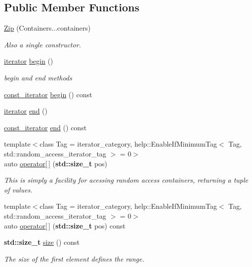 \subsection*{Public Member Functions}
\begin{DoxyCompactItemize}
\item 
\hyperlink{classit_1_1Zip_a21617f423c19eaefd796225605f7f4c3}{Zip} (Containers...\+containers)
\begin{DoxyCompactList}\small\item\em Also a single constructor. \end{DoxyCompactList}\item 
\hyperlink{classit_1_1Zip_a6f4a405b96cce4346e1a34522031366a}{iterator} \hyperlink{classit_1_1Zip_af2e6f1d41c32c94a8b790a4870bd9340}{begin} ()
\begin{DoxyCompactList}\small\item\em begin and end methods \end{DoxyCompactList}\item 
\hyperlink{classit_1_1Zip_ac9c7dacbb33c23f586cb8886fdd58275}{const\+\_\+iterator} \hyperlink{classit_1_1Zip_a1867c9ddfe0d78c7d6d826d6938ca7eb}{begin} () const 
\item 
\hyperlink{classit_1_1Zip_a6f4a405b96cce4346e1a34522031366a}{iterator} \hyperlink{classit_1_1Zip_aa9d9cb83973543f951a798e1052cc84a}{end} ()
\item 
\hyperlink{classit_1_1Zip_ac9c7dacbb33c23f586cb8886fdd58275}{const\+\_\+iterator} \hyperlink{classit_1_1Zip_aec064915b95a39b28b8eee0933c0ce5c}{end} () const 
\item 
{\footnotesize template$<$class Tag  = iterator\+\_\+category, help\+::\+Enable\+If\+Minimum\+Tag$<$ Tag, std\+::random\+\_\+access\+\_\+iterator\+\_\+tag $>$  = 0$>$ }\\auto \hyperlink{classit_1_1Zip_a48f42897ce4f6651f0eb093b80409bde}{operator\mbox{[}$\,$\mbox{]}} ({\bf std\+::size\+\_\+t} pos)
\begin{DoxyCompactList}\small\item\em This is simply a facility for acessing random access containers, returning a tuple of values. \end{DoxyCompactList}\item 
{\footnotesize template$<$class Tag  = iterator\+\_\+category, help\+::\+Enable\+If\+Minimum\+Tag$<$ Tag, std\+::random\+\_\+access\+\_\+iterator\+\_\+tag $>$  = 0$>$ }\\auto \hyperlink{classit_1_1Zip_ab4b2a9d35dc783d504d7e103c75bdfaa}{operator\mbox{[}$\,$\mbox{]}} ({\bf std\+::size\+\_\+t} pos) const 
\item 
{\bf std\+::size\+\_\+t} \hyperlink{classit_1_1Zip_a4a327ee188e189944c7f921c359ca2c8}{size} () const 
\begin{DoxyCompactList}\small\item\em The size of the first element defines the range. \end{DoxyCompactList}\end{DoxyCompactItemize}
